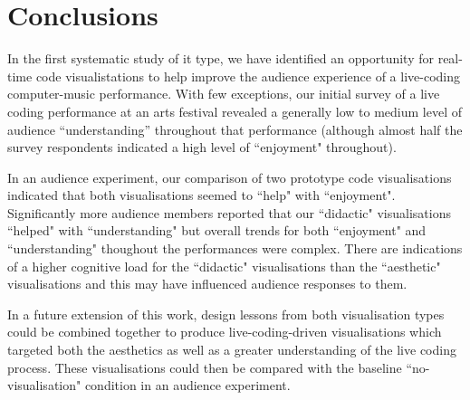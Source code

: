 \documentclass{sig-alternate}
\begin{document}
\section{Conclusions}

In the first systematic study of it type, we have identified an opportunity for real-time code visualistations to help improve the audience experience of a live-coding computer-music performance. With few exceptions, our initial survey of a live coding performance at an arts festival revealed a generally low to medium level of audience ``understanding'' throughout that performance (although almost half the survey respondents indicated a high level of ``enjoyment" throughout).

In an audience experiment, our comparison of two prototype code visualisations indicated that both visualisations seemed to ``help" with ``enjoyment". Significantly more audience members reported that our ``didactic" visualisations ``helped" with ``understanding" but overall trends for both ``enjoyment" and ``understanding" thoughout the performances were complex. There are indications of a higher cognitive load for the ``didactic" visualisations than the ``aesthetic" visualisations and this may have influenced audience responses to them. 





In a future extension of this work, design lessons from both visualisation types could be combined together to produce live-coding-driven visualisations which targeted both the aesthetics as well as a greater understanding of the live coding process. These visualisations could then be compared with the baseline ``no-visualisation" condition in an audience experiment.  

\end{document}
